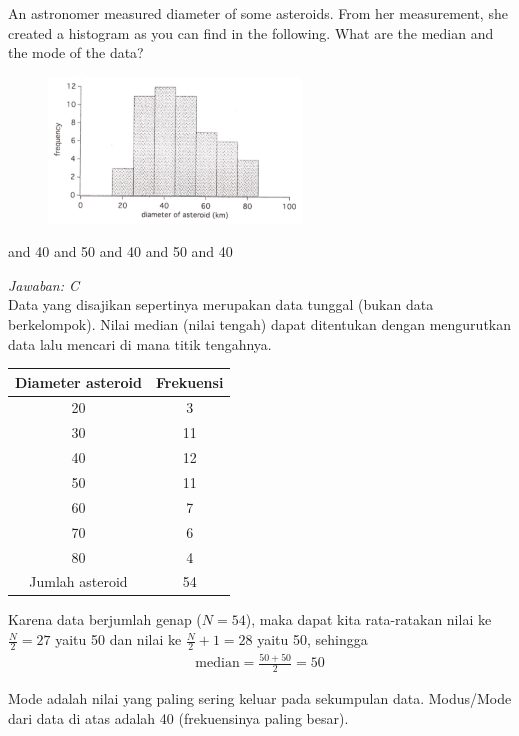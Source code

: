 \documentclass[11pt,fleqn, a4paper]{exam}
\begin{document}
\begin{questions}
\vspace{0.5cm}
\question An astronomer measured diameter of some asteroids. From her measurement, she created a histogram as you can find in the following. What are the median and the mode of the data?
\begin{figure}[H]
\centering
\includegraphics[width=0.6\textwidth]{gambar/osk2016_3.png}
\end{figure}
\begin{choices}
 and 40
 and 50
 and 40
 and 50
 and 40
\end{choices}

\textit{Jawaban: C}\\
Data yang disajikan sepertinya merupakan data tunggal (bukan data berkelompok). Nilai median (nilai tengah) dapat ditentukan dengan mengurutkan data lalu mencari di mana titik tengahnya.
\begin{table}[H]
\centering
\begin{tabular}{|c|c|}
\hline 
Diameter asteroid & Frekuensi \\ 
\hline 
20 & 3 \\ 
\hline 
30 & 11 \\ 
\hline 
40 & 12 \\ 
\hline 
50 & 11 \\ 
\hline 
60 & 7 \\ 
\hline 
70 & 6 \\ 
\hline 
80 & 4 \\ 
\hline 
Jumlah asteroid & 54 \\ 
\hline 
\end{tabular} 
\end{table}

Karena data berjumlah genap ($N = 54$), maka dapat kita rata-ratakan nilai ke $\frac{N}{2} = 27$ yaitu 50 dan nilai ke $\frac{N}{2}+1 = 28$ yaitu 50, sehingga
\begin{eqnarray*}
\text{median} = \frac{50 + 50}{2} = 50
\end{eqnarray*}

Mode adalah nilai yang paling sering keluar pada sekumpulan data. Modus/Mode dari data di atas adalah 40 (frekuensinya paling besar).



\end{questions}
\end{document}
